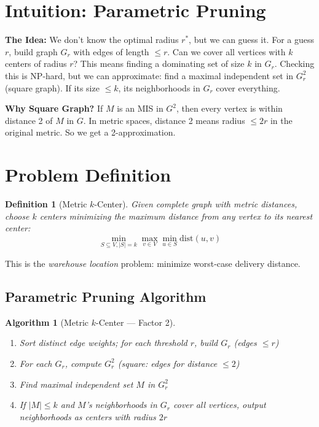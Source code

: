 \documentclass[11pt,oneside]{book}
\newtheorem{definition}[theorem]{Definition}
\newtheorem{algorithmdef}[theorem]{Algorithm}
\begin{document}
\section{Intuition: Parametric Pruning}

\begin{intuitionbox}
\textbf{The Idea:} We don't know the optimal radius $r^*$, but we can guess it. For a guess $r$, build graph $G_r$ with edges of length $\leq r$. Can we cover all vertices with $k$ centers of radius $r$? This means finding a dominating set of size $k$ in $G_r$. Checking this is NP-hard, but we can approximate: find a maximal independent set in $G_r^2$ (square graph). If its size $\leq k$, its neighborhoods in $G_r$ cover everything.

\textbf{Why Square Graph?} If $M$ is an MIS in $G^2$, then every vertex is within distance 2 of $M$ in $G$. In metric spaces, distance 2 means radius $\leq 2r$ in the original metric. So we get a 2-approximation.
\end{intuitionbox}

\section{Problem Definition}

\begin{definition}[Metric $k$-Center]
Given complete graph with metric distances, choose $k$ centers minimizing the maximum distance from any vertex to its nearest center:
\[
\min_{S \subseteq V, |S|=k} \max_{v \in V} \min_{u \in S} \text{dist}(u, v)
\]
\end{definition}

This is the \emph{warehouse location} problem: minimize worst-case delivery distance.

\subsection{Parametric Pruning Algorithm}

\begin{algorithmdef}[Metric $k$-Center — Factor 2]
\begin{enumerate}
    \item Sort distinct edge weights; for each threshold $r$, build $G_r$ (edges $\leq r$)
    \item For each $G_r$, compute $G_r^2$ (square: edges for distance $\leq 2$)
    \item Find maximal independent set $M$ in $G_r^2$
    \item If $|M| \leq k$ and $M$'s neighborhoods in $G_r$ cover all vertices, output neighborhoods as centers with radius $2r$
\end{enumerate}
\end{algorithmdef}
\end{document}
